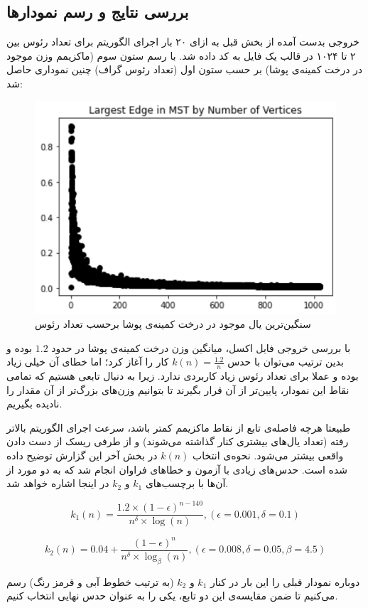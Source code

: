 \documentclass{article}
\begin{document}
\subsection{بررسی نتایج و رسم نمودارها}
خروجی بدست آمده از بخش قبل به ازای ۲۰ بار اجرای الگوریتم برای تعداد رئوس بین ۲ تا ۱۰۲۴ در قالب یک فایل
به کد
داده شد. با رسم ستون سوم (ماکزیمم وزن موجود در درخت کمینه‌ی پوشا) بر حسب ستون اول (تعداد رئوس گراف) چنین نموداری حاصل شد:

\begin{figure}[H]
    \centering
    \includegraphics[width=0.6\linewidth]{Photos/Randomized mst/first_result.png}
    \caption{
    سنگین‌ترین یال موجود در درخت کمینه‌ی پوشا برحسب تعداد رئوس
    }
    \label{fig:my_label}
\end{figure}

با بررسی خروجی فایل اکسل، میانگین وزن درخت کمینه‌ی پوشا در حدود
$1.2$
بوده و بدین ترتیب می‌توان با حدس
$k(n)=\frac{1.2}{n}$
کار را آغاز کرد؛ اما خطای آن خیلی زیاد بوده و عملا برای تعداد رئوس زیاد کاربردی ندارد. زیرا به دنبال تابعی هستیم که تمامی نقاط این نمودار، پایین‌تر از آن قرار بگیرند تا بتوانیم وزن‌های بزرگ‌تر از آن مقدار را نادیده بگیریم.

طبیعتا هرچه فاصله‌ی تابع از نقاط ماکزیمم کمتر باشد، سرعت اجرای الگوریتم بالاتر رفته (تعداد یال‌های بیشتری کنار گذاشته می‌شوند) و از طرفی ریسک از دست دادن
واقعی بیشتر می‌شود. نحوه‌ی انتخاب
$k(n)$
در بخش آخر این گزارش توضیح داده شده است. حدس‌های زیادی با آزمون و خطاهای فراوان انجام شد که به دو مورد از آن‌ها با برچسب‌های
$k_1$
و
$k_2$
در اینجا اشاره خواهد شد.

$$k_1(n)=\frac{1.2\times(1-\epsilon)^{n-140}}{n^\delta\times\log(n)}, (\epsilon=0.001, \delta=0.1)$$

$$k_2(n)=0.04+\frac{(1-\epsilon)^n}{n^\delta\times\log_{\beta}(n)}, (\epsilon=0.008, \delta=0.05, \beta=4.5)$$

دوباره نمودار قبلی را این بار در کنار 
$k_1$
و
$k_2$
(به ترتیب خطوط آبی و قرمز رنگ) رسم می‌کنیم تا ضمن مقایسه‌ی این دو تابع، یکی را به عنوان حدس نهایی انتخاب کنیم.
\end{document}

